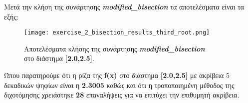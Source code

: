 \documentclass[First Project.tex]{subfiles}
\begin{document}
Μετά την κλήση της συνάρτησης \textit{\textlatin{\textbf{modified\_bisection}}} τα αποτελέσματα είναι τα εξής:
\vspace{5px}
\begin{figure}[h!]
    \centering
    \captionsetup{justification=centering}
    \begin{center}
    \texttt{[image: exercise\_2\_bisection\_results\_third\_root.png]}    
    \caption{ Αποτελέσματα κλήσης της συνάρτησης \textit{\textlatin{\textbf{modified\_bisection}}} \\ στο διάστημα \textbf{[2.0,2.5]}.}
    \end{center}
\end{figure}

Ώπου παρατηρούμε ότι η ρίζα της \textlatin{\textbf{f(x)}} στο διάστημα \textbf{[2.0,2.5]} με ακρίβεια 5 δεκαδικών ψηφίων 
είναι η \textbf{2.3005} καθώς και ότι η τροποποιημένη μέθοδος της διχοτόμησης χρειάστηκε \textbf{28} επαναλήψεις για να επιτύχει την 
επιθυμητή ακρίβεια.
\end{document}
